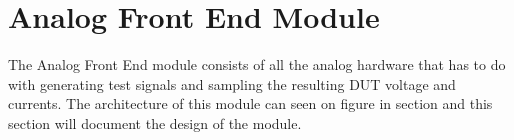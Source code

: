 \section{Analog Front End Module} \label{sec:AnalogFrontEndModule}
The Analog Front End module consists of all the analog hardware that has to do with generating test signals and sampling the resulting DUT voltage and currents. The architecture of this module can seen on figure  in section  and this section will document the design of the module.
